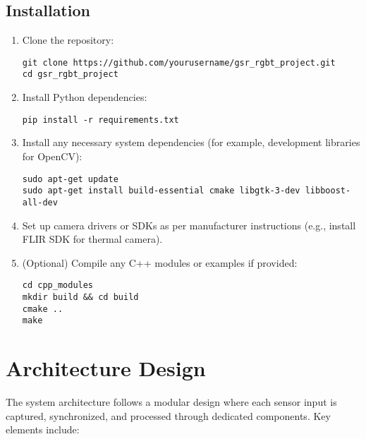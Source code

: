 \documentclass{article}
\begin{document}
    \subsection{Installation}

    \begin{enumerate}
        \item Clone the repository:
        \begin{verbatim}
git clone https://github.com/yourusername/gsr_rgbt_project.git
cd gsr_rgbt_project
        \end{verbatim}
        \item Install Python dependencies:
        \begin{verbatim}
pip install -r requirements.txt
        \end{verbatim}
        \item Install any necessary system dependencies (for example, development libraries for OpenCV):
        \begin{verbatim}
sudo apt-get update
sudo apt-get install build-essential cmake libgtk-3-dev libboost-all-dev
        \end{verbatim}
        \item Set up camera drivers or SDKs as per manufacturer instructions (e.g., install FLIR SDK for thermal camera).
        \item (Optional) Compile any C++ modules or examples if provided:
        \begin{verbatim}
cd cpp_modules
mkdir build && cd build
cmake ..
make
        \end{verbatim}
    \end{enumerate}


    \section{Architecture Design}

    The system architecture follows a modular design where each sensor input is captured, synchronized, and processed through dedicated components. Key elements include:
\end{document}
